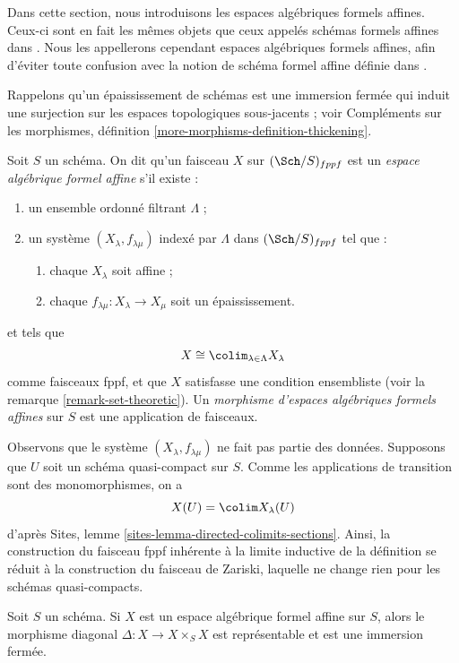 \noindent
Dans cette section, nous introduisons les espaces algébriques formels affines.
Ceux-ci sont en fait les mêmes objets que ceux appelés schémas
formels affines dans \cite{BVGD}. Nous les appellerons cependant
espaces algébriques formels affines, afin d'éviter toute confusion avec
la notion de schéma formel affine définie dans \cite{EGA}.

\medskip\noindent
Rappelons qu'un épaississement de schémas est une immersion
fermée qui induit une surjection sur les espaces topologiques
sous-jacents ; voir Compléments sur les morphismes, définition
\ref{more-morphisms-definition-thickening}.

\begin{definition}
\label{definition-affine-formal-algebraic-space}
Soit $S$ un schéma. On dit qu'un faisceau $X$ sur $(\Sch/S)_{fppf}$ est un
{\it espace algébrique formel affine} s'il existe :
\begin{enumerate}
\item un ensemble ordonné filtrant $\Lambda$ ;
\item un système $(X_\lambda, f_{\lambda \mu})$ indexé par $\Lambda$
dans $(\Sch/S)_{fppf}$ tel que :
\begin{enumerate}
\item chaque $X_\lambda$ soit affine ;
\item chaque $f_{\lambda \mu} : X_\lambda \to X_\mu$ soit un épaississement.
\end{enumerate}
\end{enumerate}
et tels que
$$
X \cong \colim_{\lambda \in \Lambda} X_\lambda
$$
comme faisceaux fppf, et que $X$ satisfasse une condition ensembliste
(voir la remarque \ref{remark-set-theoretic}). Un
{\it morphisme d'espaces algébriques formels affines}
sur $S$ est une application de faisceaux.
\end{definition}

\noindent
Observons que le système $(X_\lambda, f_{\lambda \mu})$ ne fait pas
partie des données. Supposons que $U$ soit un schéma quasi-compact sur $S$.
Comme les applications de transition sont des monomorphismes, on a
$$
X(U) = \colim X_\lambda(U)
$$
d'après Sites, lemme \ref{sites-lemma-directed-colimits-sections}.
Ainsi, la construction du faisceau fppf inhérente à la limite inductive de la
définition se réduit à la construction du faisceau de Zariski, laquelle ne change
rien pour les schémas quasi-compacts.

\begin{lemma}
\label{lemma-diagonal-affine-formal-algebraic-space}
Soit $S$ un schéma. Si $X$ est un espace algébrique formel affine sur
$S$, alors le morphisme diagonal $\Delta : X \to X \times_S X$
est représentable et est une immersion fermée.
\end{lemma}


